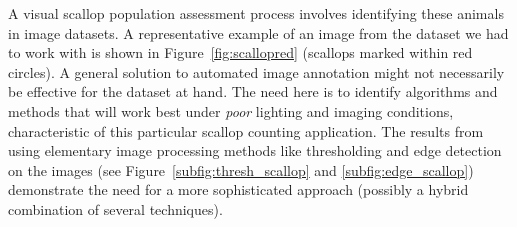 \documentclass {udthesis}
\begin{document}
A visual scallop population assessment process involves identifying these animals in image datasets.
A representative example of an image from the dataset we had to work with is shown in  Figure~\ref{fig:scallopred} (scallops marked within red circles).
A general solution to automated image annotation might not necessarily be effective for the dataset at hand.
The need here is to identify algorithms and methods that will work best under \emph{poor} lighting and imaging conditions, characteristic of this particular scallop counting application. 
The results from using elementary image processing methods like thresholding and edge detection on the images (see Figure~\ref{subfig:thresh_scallop} and \ref{subfig:edge_scallop}) demonstrate the need for a more sophisticated approach (possibly a hybrid combination of several techniques).
\end{document}
